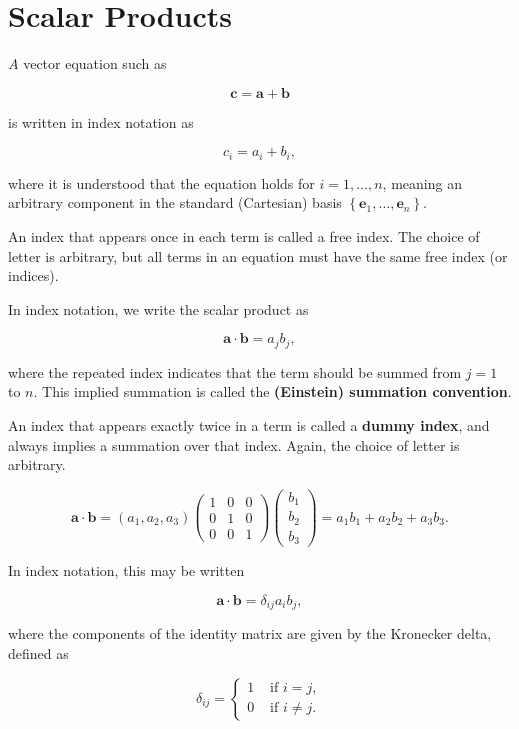 \section{Scalar Products}

\begin{definition}
  \(A\) vector equation such as

\[
\boldsymbol{c}=\boldsymbol{a}+\boldsymbol{b}
\]

is written in index notation as

\[
c_i=a_i+b_i,
\]

where it is understood that the equation holds for \(i=1, \ldots, n\), meaning an arbitrary component in the standard (Cartesian) basis \(\left\{\boldsymbol{e}_1, \ldots, \boldsymbol{e}_n\right\}\).
\end{definition}

\begin{remark}
  An index that appears once in each term is called a free index. The choice of letter is arbitrary, but all terms in an equation must have the same free index (or indices).
\end{remark}

\begin{definition}
  In index notation, we write the scalar product as

\[
\boldsymbol{a} \cdot \boldsymbol{b}=a_j b_j,
\]

where the repeated index indicates that the term should be summed from \(j=1\) to \(n\). This implied summation is called the \textbf{(Einstein) summation convention}.

An index that appears exactly twice in a term is called a \textbf{dummy index}, and always implies a summation over that index. Again, the choice of letter is arbitrary.
\end{definition}

\begin{definition}
  \[
\boldsymbol{a} \cdot \boldsymbol{b}=\left(a_1, a_2, a_3\right)\left(\begin{array}{lll}
1 & 0 & 0 \\
0 & 1 & 0 \\
0 & 0 & 1
\end{array}\right)\left(\begin{array}{l}
b_1 \\
b_2 \\
b_3
\end{array}\right)=a_1 b_1+a_2 b_2+a_3 b_3 .
\]

In index notation, this may be written

\[
\boldsymbol{a} \cdot \boldsymbol{b}=\delta_{i j} a_i b_j,
\]

where the components of the identity matrix are given by the Kronecker delta, defined as

\[
\delta_{i j}= \begin{cases}1 & \text { if } i=j, \\ 0 & \text { if } i \neq j .\end{cases}
\]
\end{definition}

